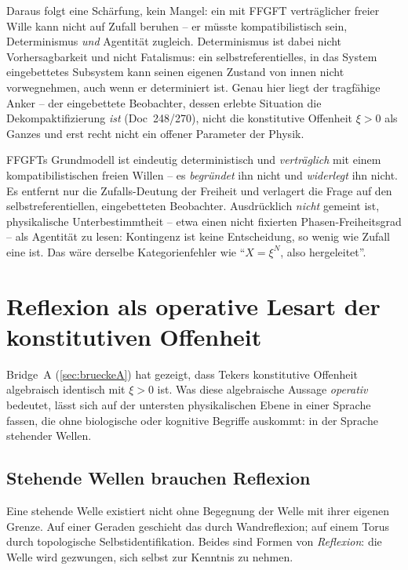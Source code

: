 Daraus folgt eine Schärfung, kein Mangel: ein mit FFGFT verträglicher freier Wille kann nicht auf Zufall beruhen -- er müsste kompatibilistisch sein, Determinismus \emph{und} Agentität zugleich. Determinismus ist dabei nicht Vorhersagbarkeit und nicht Fatalismus: ein selbstreferentielles, in das System eingebettetes Subsystem kann seinen eigenen Zustand von innen nicht vorwegnehmen, auch wenn er determiniert ist. Genau hier liegt der tragfähige Anker -- der eingebettete Beobachter, dessen erlebte Situation die Dekompaktifizierung \emph{ist} (Doc~248/270), nicht die konstitutive Offenheit $\xi>0$ als Ganzes und erst recht nicht ein offener Parameter der Physik.

\begin{interpretation}
FFGFTs Grundmodell ist eindeutig deterministisch und \emph{verträglich} mit einem kompatibilistischen freien Willen -- es \emph{begründet} ihn nicht und \emph{widerlegt} ihn nicht. Es entfernt nur die Zufalls-Deutung der Freiheit und verlagert die Frage auf den selbstreferentiellen, eingebetteten Beobachter. Ausdrücklich \emph{nicht} gemeint ist, physikalische Unterbestimmtheit -- etwa einen nicht fixierten Phasen-Freiheitsgrad -- als Agentität zu lesen: Kontingenz ist keine Entscheidung, so wenig wie Zufall eine ist. Das wäre derselbe Kategorienfehler wie \enquote{$X=\xi^N$, also hergeleitet}.
\end{interpretation}

\section{Reflexion als operative Lesart der konstitutiven Offenheit}\label{sec:reflexion}

Bridge~A (\ref{sec:brueckeA}) hat gezeigt, dass Tekers konstitutive Offenheit algebraisch identisch mit $\xi > 0$ ist. Was diese algebraische Aussage \emph{operativ} bedeutet, lässt sich auf der untersten physikalischen Ebene in einer Sprache fassen, die ohne biologische oder kognitive Begriffe auskommt: in der Sprache stehender Wellen.

\subsection{Stehende Wellen brauchen Reflexion}\label{sec:reflexion_stehend}

Eine stehende Welle existiert nicht ohne Begegnung der Welle mit ihrer eigenen Grenze. Auf einer Geraden geschieht das durch Wandreflexion; auf einem Torus durch topologische Selbstidentifikation. Beides sind Formen von \emph{Reflexion}: die Welle wird gezwungen, sich selbst zur Kenntnis zu nehmen.

